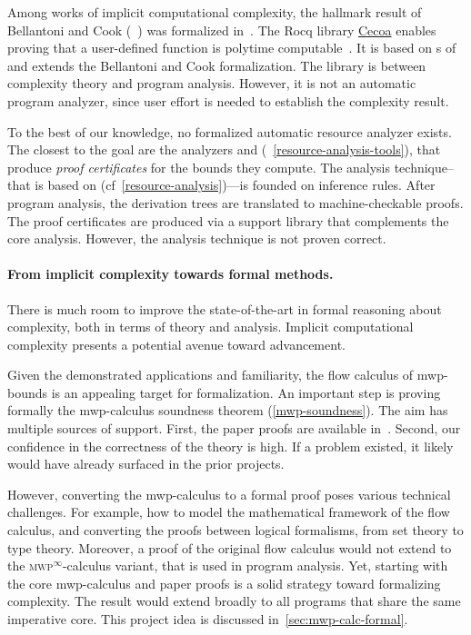 Among works of implicit computational complexity, the hallmark result of
Bellantoni and Cook (~) was formalized
in~\textcite{heraud2011}. The Rocq library
\href{https://github.com/davidnowak/cecoa}{Cecoa}{} enables proving
that a user-defined function is polytime computable~\cite{feree2018}. It is
based on s of~\textcite{marion2000} and extends the
Bellantoni and Cook formalization. The  library is between complexity
theory and program analysis. However, it is not an automatic program analyzer,
since user effort is needed to establish the complexity result.

To the best of our knowledge, no formalized automatic resource analyzer exists.
The closest to the goal are the analyzers  and 
(\cf~\autoref{resource-analysis-tools}), that produce \emph{proof certificates}
for the bounds they compute. The analysis technique--that is based on
(cf~\autoref{resource-analysis})---is founded on inference rules. After program
analysis, the derivation trees are translated to machine-checkable proofs. The
proof certificates are produced via a support library that complements the core
analysis. However, the analysis {technique} is not proven correct.

\paragraph*{From implicit complexity towards formal methods.}
There is much room to improve the state-of-the-art in formal reasoning about
complexity, both in terms of theory and analysis. Implicit computational
complexity presents a potential avenue toward advancement.

Given the demonstrated applications and familiarity, the flow calculus of
mwp-bounds is an appealing target for formalization. An
important step is proving formally the mwp-calculus soundness
theorem (\autoref{mwp-soundness}). The aim has
multiple sources of support. First, the paper proofs are available
in~\cite{jones2009}. Second, our confidence in the correctness of the theory is
high. If a problem existed, it likely would have already surfaced in the prior
projects.

However, converting the mwp-calculus to a formal proof poses various technical
challenges. For example, how to model the mathematical framework of the flow
calculus, and converting the proofs between logical formalisms, from set theory
to type theory. Moreover, a proof of the original flow calculus would not extend
to the \textsc{mwp}$^\infty$-calculus variant, that is used in
program analysis. Yet, starting with the core mwp-calculus and paper proofs is a
solid strategy toward formalizing complexity. The result would extend broadly to
all programs that share the same imperative core. This project idea is discussed
in~\autoref{sec:mwp-calc-formal}.

